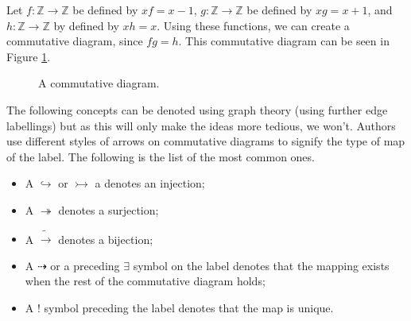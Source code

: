 \documentclass[12pt]{article}
\theoremstyle{definition}
\theoremstyle{remark}
\begin{document}
Let $f:\mathbb{Z}\to\mathbb{Z}$ be defined by $xf=x-1$, $g:\mathbb{Z}\to\mathbb{Z}$ be defined by $xg=x+1$, and $h:\mathbb{Z}\to\mathbb{Z}$ by defined by $xh=x$. Using these functions, we can create a commutative diagram, since $fg=h$. This commutative diagram can be seen in Figure \ref{fig:com-diag-id}.

\begin{figure}[h]
  \centering
  
  \caption{A commutative diagram.}
  \label{fig:com-diag-id}
\end{figure}

The following concepts can be denoted using graph theory (using further edge labellings) but as this will only make the ideas more tedious, we won't. Authors use different styles of arrows on commutative diagrams to signify the type of map of the label. The following is the list of the most common ones.

\begin{itemize}
\item A $\hookrightarrow$ or $\rightarrowtail$ a denotes an injection;
\item A $\twoheadrightarrow$ denotes a surjection;
\item A $\tilde{\rightarrow}$ denotes a bijection;
\item A $\dashrightarrow$ or a preceding $\exists$ symbol on the label denotes that the mapping exists when the rest of the commutative diagram holds;
\item A $!$ symbol preceding the label denotes that the map is unique.
  
\end{itemize}
\end{document}
